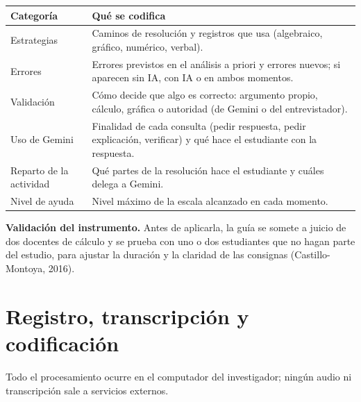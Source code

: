 \documentclass[11pt,letterpaper]{article}
\begin{document}
\begin{center}
\small
\renewcommand{\arraystretch}{1.3}
\begin{tabularx}{\linewidth}{@{}p{3.4cm}L@{}}
\toprule
\textbf{Categoría} & \textbf{Qué se codifica}\\
\midrule
Estrategias & Caminos de resolución y registros que usa (algebraico, gráfico, numérico, verbal).\\
Errores & Errores previstos en el análisis a priori y errores nuevos; si aparecen sin IA, con IA o en ambos momentos.\\
Validación & Cómo decide que algo es correcto: argumento propio, cálculo, gráfica o autoridad (de Gemini o del entrevistador).\\
Uso de Gemini & Finalidad de cada consulta (pedir respuesta, pedir explicación, verificar) y qué hace el estudiante con la respuesta.\\
Reparto de la actividad & Qué partes de la resolución hace el estudiante y cuáles delega a Gemini.\\
Nivel de ayuda & Nivel máximo de la escala alcanzado en cada momento.\\
\bottomrule
\end{tabularx}
\end{center}

\noindent\textbf{Validación del instrumento.} Antes de aplicarla, la guía se somete a juicio de dos docentes de cálculo y se prueba con uno o dos estudiantes que no hagan parte del estudio, para ajustar la duración y la claridad de las consignas (Castillo-Montoya, 2016).

\section{Registro, transcripción y codificación}\label{sec:registro}

Todo el procesamiento ocurre en el computador del investigador; ningún audio ni transcripción sale a servicios externos.
\end{document}
